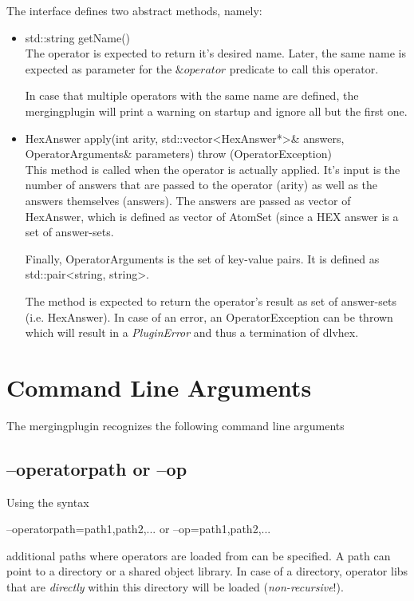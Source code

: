 \documentclass[a4paper,11pt]{article}
\theoremstyle{definition}
\newcommand{\hex}{\textsf{HEX}\xspace }
\newcommand{\dlvhex}{\textsf{dlvhex}\xspace }
\newcommand{\inlinecode}[1]{\textsf{#1}\xspace }
\begin{document}
		The interface defines two abstract methods, namely:
		\begin{itemize}
			\item \inlinecode{std::string getName()} \\
					The operator is expected to return it's desired name. Later, the same name is expected as parameter for the $\mathit{\&operator}$ predicate to call this operator.
					
					In case that multiple operators with the same name are defined, the mergingplugin will print a warning on startup and ignore all but the first one.
			\item \inlinecode{HexAnswer apply(int arity, std::vector\textless HexAnswer*\textgreater \& answers, OperatorArguments\& parameters) throw (OperatorException)} \\
					This method is called when the operator is actually applied. It's input is the number of answers that are passed to the operator (arity) as well as the answers
					themselves (answers). The answers are passed as vector of \inlinecode{HexAnswer}, which is defined as vector of \inlinecode{AtomSet} (since a \hex answer is a
					set of answer-sets.
					
					Finally, \inlinecode{OperatorArguments} is the set of key-value pairs. It is defined as \inlinecode{std::pair\textless string, string\textgreater}.
					
					The method is expected to return the operator's result as set of answer-sets (i.e. \inlinecode{HexAnswer}). In case of an error, an \inlinecode{OperatorException}
					can be thrown which will result in a \emph{PluginError} and thus a termination of \dlvhex.
		\end{itemize}

		
	\section{Command Line Arguments}
	\label{sec:Arguments}
	
		The mergingplugin recognizes the following command line arguments

		
		\subsection{\inlinecode{--operatorpath} or \inlinecode{--op}}
		
			Using the syntax
			\begin{center}
				\inlinecode{--operatorpath=path1,path2,...} or \inlinecode{--op=path1,path2,...}
			\end{center}
			additional paths where operators are loaded from can be specified. A path can point to a directory or a shared object library. In case of a directory, operator libs
			that are \emph{directly} within this directory will be loaded (\emph{non-recursive}!).
\end{document}
